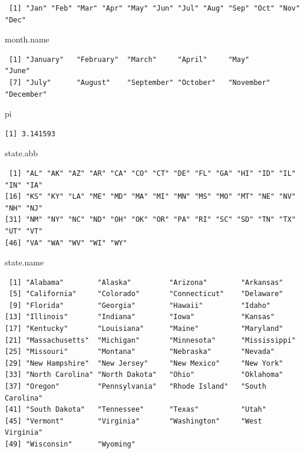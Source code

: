 \documentclass[
  letterpaper,
  DIV=11,
  numbers=noendperiod]{scrreprt}
\newenvironment{Shaded}{\begin{snugshade}}{\end{snugshade}}
\newcommand{\NormalTok}[1]{\textcolor[rgb]{0.00,0.23,0.31}{#1}}
\begin{document}
\begin{tcolorbox}
\begin{verbatim}
 [1] "Jan" "Feb" "Mar" "Apr" "May" "Jun" "Jul" "Aug" "Sep" "Oct" "Nov" "Dec"
\end{verbatim}

\begin{Shaded}
\begin{Highlighting}[]
\NormalTok{month.name}
\end{Highlighting}
\end{Shaded}

\begin{verbatim}
 [1] "January"   "February"  "March"     "April"     "May"       "June"     
 [7] "July"      "August"    "September" "October"   "November"  "December" 
\end{verbatim}

\begin{Shaded}
\begin{Highlighting}[]
\NormalTok{pi}
\end{Highlighting}
\end{Shaded}

\begin{verbatim}
[1] 3.141593
\end{verbatim}

\begin{Shaded}
\begin{Highlighting}[]
\NormalTok{state.abb}
\end{Highlighting}
\end{Shaded}

\begin{verbatim}
 [1] "AL" "AK" "AZ" "AR" "CA" "CO" "CT" "DE" "FL" "GA" "HI" "ID" "IL" "IN" "IA"
[16] "KS" "KY" "LA" "ME" "MD" "MA" "MI" "MN" "MS" "MO" "MT" "NE" "NV" "NH" "NJ"
[31] "NM" "NY" "NC" "ND" "OH" "OK" "OR" "PA" "RI" "SC" "SD" "TN" "TX" "UT" "VT"
[46] "VA" "WA" "WV" "WI" "WY"
\end{verbatim}

\begin{Shaded}
\begin{Highlighting}[]
\NormalTok{state.name}
\end{Highlighting}
\end{Shaded}

\begin{verbatim}
 [1] "Alabama"        "Alaska"         "Arizona"        "Arkansas"      
 [5] "California"     "Colorado"       "Connecticut"    "Delaware"      
 [9] "Florida"        "Georgia"        "Hawaii"         "Idaho"         
[13] "Illinois"       "Indiana"        "Iowa"           "Kansas"        
[17] "Kentucky"       "Louisiana"      "Maine"          "Maryland"      
[21] "Massachusetts"  "Michigan"       "Minnesota"      "Mississippi"   
[25] "Missouri"       "Montana"        "Nebraska"       "Nevada"        
[29] "New Hampshire"  "New Jersey"     "New Mexico"     "New York"      
[33] "North Carolina" "North Dakota"   "Ohio"           "Oklahoma"      
[37] "Oregon"         "Pennsylvania"   "Rhode Island"   "South Carolina"
[41] "South Dakota"   "Tennessee"      "Texas"          "Utah"          
[45] "Vermont"        "Virginia"       "Washington"     "West Virginia" 
[49] "Wisconsin"      "Wyoming"       
\end{verbatim}


\end{tcolorbox}
\end{document}
